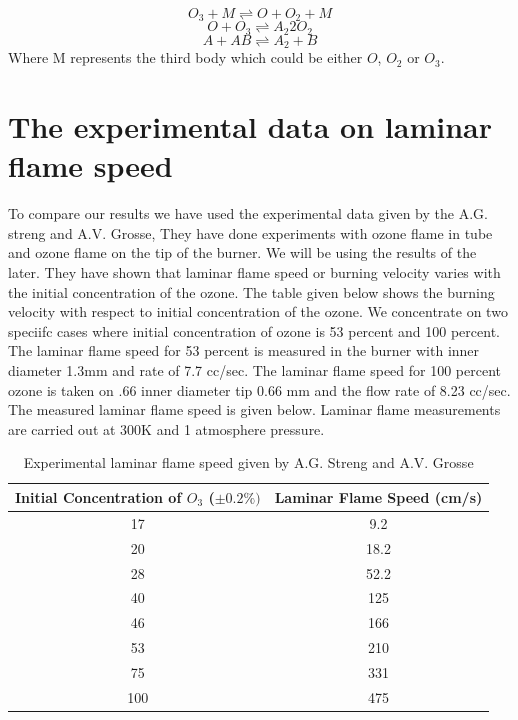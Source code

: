 			$$O_3 + M \rightleftharpoons O + O_2 + M $$
			$$ O + O_3 \rightleftharpoons A_2  2O_2$$ 
			$$A + AB \rightleftharpoons A_2 + B$$
\noindent Where M represents the third body which could be either $O$, $O_2$ or $O_3$. 


\section{The experimental data on laminar flame speed}

To compare our results we have used the experimental data given by the A.G.  streng and A.V. Grosse, They have done experiments with ozone flame in tube and ozone flame on the tip of the burner. We will be using the results of the later. They have shown that laminar flame speed or burning velocity varies with the initial concentration of the ozone. The table given below shows the burning velocity with respect to initial concentration of the ozone. We concentrate on two speciifc cases where initial concentration of ozone is 53 percent and 100 percent. The laminar flame speed for 53 percent is measured in the burner with inner diameter 1.3mm  and rate of 7.7 cc/sec. The laminar flame speed for 100 percent ozone is taken on .66 inner diameter tip 0.66 mm and the flow rate of 8.23 cc/sec. 
The measured laminar flame speed is given below. Laminar flame measurements are carried out at 300K and 1 atmosphere pressure. 

\begin{table}[h]
\caption {Experimental laminar flame speed given by A.G. Streng and A.V. Grosse} \label{tab:title}
\begin{center}

\begin{tabular}{|c|c|}
\hline
 \textbf{ Initial Concentration of $O_3$ ($\pm 0.2 \% )$}  &  \textbf{ Laminar Flame Speed (cm/s)} \\ \hline
 17& 9.2 \\  \hline
 20& 18.2 \\ \hline
 28& 52.2 \\ \hline
 40& 125 \\  \hline
 46&  166 \\ \hline
 53&  210 \\ \hline
 75&  331 \\ \hline
100&  475 \\ \hline
\end{tabular}
\end{center}
\end{table}

